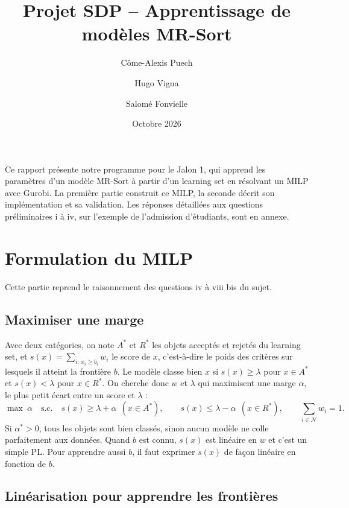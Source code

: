 \documentclass[10pt,a4paper]{article}
\title{Projet SDP -- Apprentissage de modèles MR-Sort}
\author{Côme-Alexis Puech \and Hugo Vigna \and Salomé Fonvielle}
\date{Octobre 2026}
\newcommand{\N}{\mathcal{N}}
\begin{document}
\maketitle

Ce rapport présente notre programme pour le Jalon 1, qui apprend les paramètres d'un modèle MR-Sort à partir
d'un learning set en résolvant un MILP avec Gurobi. La première partie construit ce MILP, la seconde décrit son
implémentation et sa validation. Les réponses détaillées aux questions préliminaires i à iv, sur l'exemple de
l'admission d'étudiants, sont en annexe.

\section*{Formulation du MILP}

Cette partie reprend le raisonnement des questions iv à viii bis du sujet.

\subsection*{Maximiser une marge}

Avec deux catégories, on note $A^*$ et $R^*$ les objets acceptés et rejetés du learning set, et $s(x)=\sum_{i:\,x_i\geq b_i} w_i$
le score de $x$, c'est-à-dire le poids des critères sur lesquels il atteint la frontière $b$. Le modèle classe bien $x$ si
$s(x)\geq\lambda$ pour $x\in A^*$ et $s(x)<\lambda$ pour $x\in R^*$. On cherche donc $w$ et $\lambda$ qui maximisent une marge
$\alpha$, le plus petit écart entre un score et $\lambda$ :
\[
\max\ \alpha \quad\text{s.c.}\quad s(x)\geq\lambda+\alpha\ \ (x\in A^*),\qquad s(x)\leq\lambda-\alpha\ \ (x\in R^*),\qquad \textstyle\sum_{i\in\N} w_i=1 .
\]
Si $\alpha^*>0$, tous les objets sont bien classés, sinon aucun modèle ne colle parfaitement aux données.
Quand $b$ est connu, $s(x)$ est linéaire en $w$ et c'est un simple PL. Pour apprendre aussi $b$, il faut exprimer
$s(x)$ de façon linéaire en fonction de $b$.

\subsection*{Linéarisation pour apprendre les frontières}
\end{document}
